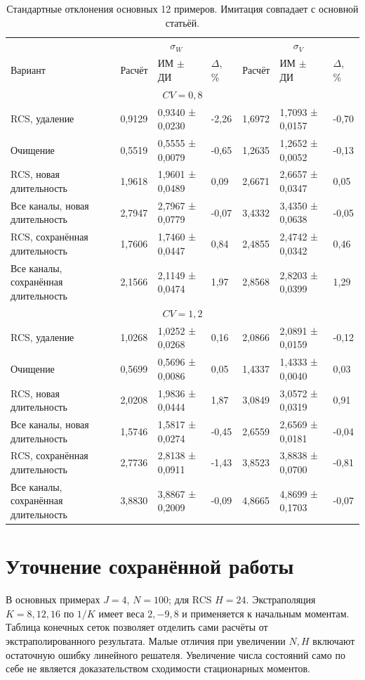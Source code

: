 \documentclass[a4paper,12pt]{article}
\begin{document}
\begin{table}[!htbp]
\centering\small\setlength{\tabcolsep}{2pt}
\begin{tabular}{@{}p{4.16cm}p{1.61cm}p{2.83cm}p{1.28cm}p{1.61cm}p{2.83cm}p{1.28cm}@{}}
\toprule
 & \multicolumn{3}{c}{$\sigma_W$} & \multicolumn{3}{c}{$\sigma_V$} \\
Вариант & Расчёт & ИМ $\pm$ ДИ & $\Delta$, \% & Расчёт & ИМ $\pm$ ДИ & $\Delta$, \% \\
\midrule
\multicolumn{7}{c}{$CV=0,8$} \\
RCS, удаление & 0,9129 & 0,9340 ± 0,0230 & -2,26 & 1,6972 & 1,7093 ± 0,0157 & -0,70 \\
Очищение & 0,5519 & 0,5555 ± 0,0079 & -0,65 & 1,2635 & 1,2652 ± 0,0052 & -0,13 \\
RCS, новая длительность & 1,9618 & 1,9601 ± 0,0489 & 0,09 & 2,6671 & 2,6657 ± 0,0347 & 0,05 \\
Все каналы, новая длительность & 2,7947 & 2,7967 ± 0,0779 & -0,07 & 3,4332 & 3,4350 ± 0,0638 & -0,05 \\
RCS, сохранённая длительность & 1,7606 & 1,7460 ± 0,0447 & 0,84 & 2,4855 & 2,4742 ± 0,0342 & 0,46 \\
Все каналы, сохранённая длительность & 2,1566 & 2,1149 ± 0,0474 & 1,97 & 2,8568 & 2,8203 ± 0,0399 & 1,29 \\
\multicolumn{7}{c}{$CV=1,2$} \\
RCS, удаление & 1,0268 & 1,0252 ± 0,0268 & 0,16 & 2,0866 & 2,0891 ± 0,0159 & -0,12 \\
Очищение & 0,5699 & 0,5696 ± 0,0086 & 0,05 & 1,4337 & 1,4333 ± 0,0040 & 0,03 \\
RCS, новая длительность & 2,0208 & 1,9836 ± 0,0444 & 1,87 & 3,0849 & 3,0572 ± 0,0319 & 0,91 \\
Все каналы, новая длительность & 1,5746 & 1,5817 ± 0,0274 & -0,45 & 2,6559 & 2,6569 ± 0,0181 & -0,04 \\
RCS, сохранённая длительность & 2,7736 & 2,8138 ± 0,0911 & -1,43 & 3,8523 & 3,8838 ± 0,0700 & -0,81 \\
Все каналы, сохранённая длительность & 3,8830 & 3,8867 ± 0,2009 & -0,09 & 4,8665 & 4,8699 ± 0,1703 & -0,07 \\
\bottomrule
\end{tabular}
\caption{Стандартные отклонения основных 12 примеров. Имитация совпадает с основной статьёй.}
\label{tab:std}
\end{table}

\section{Уточнение сохранённой работы}
В основных примерах \(J=4\), \(N=100\); для RCS \(H=24\). Экстраполяция \(K=8,12,16\) по \(1/K\) имеет веса \(2,-9,8\) и применяется к начальным моментам. Таблица конечных сеток позволяет отделить сами расчёты от экстраполированного результата. Малые отличия при увеличении \(N,H\) включают остаточную ошибку линейного решателя. Увеличение числа состояний само по себе не является доказательством сходимости стационарных моментов.
\end{document}
